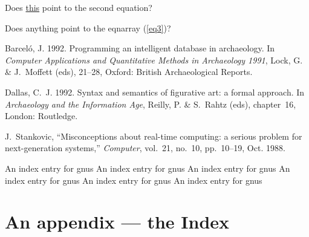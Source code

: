 \documentclass[11pt]{book}
\begin{document}
Does \hyperref{}{equation}{2.2}{this} point to the second equation?

Does anything point to the eqnarray (\autoref{eq3})?

\begin{thebibliography}{99}
{Barcel\'o, J.} 1992.
\newblock Programming an intelligent database in archaeology. In \emph{Computer
  Applications and Quantitative Methods in Archaeology 1991}, {Lock, G. \&
  J.~Moffett} (eds),   21--28, Oxford: British Archaeological Reports.

{Dallas, C.~J.} 1992.
\newblock Syntax and semantics of figurative art: a formal approach. In
  \emph{Archaeology and the Information Age}, {Reilly, P. \& S.~Rahtz} (eds),
  chapter~16, London: Routledge.

J.~Stankovic, ``Misconceptions about real-time computing: a serious problem for
  next-generation systems,'' {\em Computer}, vol.~21, no.~10, pp.~10--19, Oct.
  1988.

\end{thebibliography}

\clearpage
An index entry for gnus
\clearpage
An index entry for gnus
\clearpage
An index entry for gnus
\clearpage
An index entry for gnus
\clearpage
An index entry for gnus
\clearpage
An index entry for gnus
\chapter*{An appendix --- the Index}
\printindex
\end{document}

